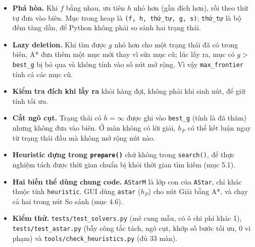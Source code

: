 \begin{itemize}
\tightlist
\item
  \textbf{Phá hòa.} Khi \(f\) bằng nhau, ưu tiên \(h\) nhỏ hơn (gần đích hơn), rồi theo thứ tự đưa vào biên. Mục trong heap là \texttt{(f, h, thứ\_\allowbreak{}tự, g, s)}; \texttt{thứ\_\allowbreak{}tự} là bộ đếm tăng dần, để Python không phải so sánh hai trạng thái.
\item
  \textbf{Lazy deletion.} Khi tìm được \(g\) nhỏ hơn cho một trạng thái đã có trong biên, A* đưa thêm một mục mới thay vì sửa mục cũ; lúc lấy ra, mục có \(g >\) \texttt{best\_\allowbreak{}g} bị bỏ qua và không tính vào số nút mở rộng. Vì vậy \texttt{max\_\allowbreak{}frontier} tính cả các mục cũ.
\item
  \textbf{Kiểm tra đích khi lấy ra} khỏi hàng đợi, không phải khi sinh nút, để giữ tính tối ưu.
\item
  \textbf{Cắt ngõ cụt.} Trạng thái có \(h = \infty\) được ghi vào \texttt{best\_\allowbreak{}g} (tính là đã thăm) nhưng không đưa vào biên. Ở màn không có lời giải, \(h_P\) có thể kết luận ngay từ trạng thái đầu mà không mở rộng nút nào.
\item
  \textbf{Heuristic dựng trong \texttt{prepare()}} chứ không trong \texttt{search()}, để thực nghiệm tách được thời gian chuẩn bị khỏi thời gian tìm kiếm (mục 5.1).
\item
  \textbf{Hai biến thể dùng chung code.} \texttt{AStarM} là lớp con của \texttt{AStar}, chỉ khác thuộc tính \texttt{heuristic}. GUI dùng \texttt{astar} (\(h_P\)) cho nút Giải bằng A*, và chạy cả hai trong nút So sánh (mục 4.6).
\item
  \textbf{Kiểm thử.} \texttt{tests/\allowbreak{}test\_\allowbreak{}solvers.\allowbreak{}py} (mê cung mẫu, có ô chi phí khác 1), \texttt{tests/\allowbreak{}test\_\allowbreak{}astar.\allowbreak{}py} (bẫy công tắc tách, ngõ cụt, khớp số bước tối ưu, 0 vi phạm) và \texttt{tools/\allowbreak{}check\_\allowbreak{}heuristics.\allowbreak{}py} (đủ 33 màn).
\end{itemize}
